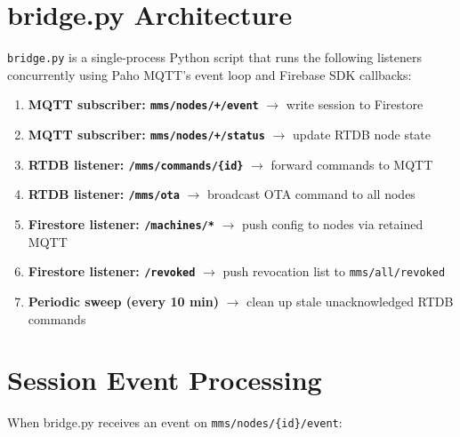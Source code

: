 \section{bridge.py Architecture}

\texttt{bridge.py} is a single-process Python script that runs the following listeners concurrently using Paho MQTT's event loop and Firebase SDK callbacks:

\begin{enumerate}[leftmargin=1.5em]
    \item \textbf{MQTT subscriber: \texttt{mms/nodes/+/event}} $\rightarrow$ write session to Firestore
    \item \textbf{MQTT subscriber: \texttt{mms/nodes/+/status}} $\rightarrow$ update RTDB node state
    \item \textbf{RTDB listener: \texttt{/mms/commands/\{id\}}} $\rightarrow$ forward commands to MQTT
    \item \textbf{RTDB listener: \texttt{/mms/ota}} $\rightarrow$ broadcast OTA command to all nodes
    \item \textbf{Firestore listener: \texttt{/machines/*}} $\rightarrow$ push config to nodes via retained MQTT
    \item \textbf{Firestore listener: \texttt{/revoked}} $\rightarrow$ push revocation list to \texttt{mms/all/revoked}
    \item \textbf{Periodic sweep (every 10 min)} $\rightarrow$ clean up stale unacknowledged RTDB commands
\end{enumerate}

\section{Session Event Processing}

When bridge.py receives an event on \texttt{mms/nodes/\{id\}/event}:

